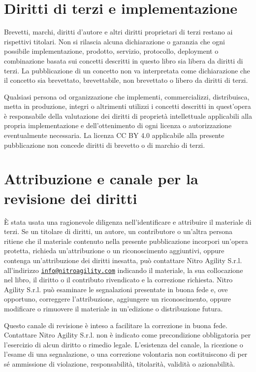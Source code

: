 \documentclass[10pt,oneside,openany]{book}
\begin{document}
\section{Diritti di terzi e implementazione}
Brevetti, marchi, diritti d'autore e altri diritti proprietari di terzi restano ai rispettivi titolari. Non si rilascia alcuna dichiarazione o garanzia che ogni possibile implementazione, prodotto, servizio, protocollo, deployment o combinazione basata sui concetti descritti in questo libro sia libera da diritti di terzi. La pubblicazione di un concetto non va interpretata come dichiarazione che il concetto sia brevettato, brevettabile, non brevettato o libero da diritti di terzi.

Qualsiasi persona od organizzazione che implementi, commercializzi, distribuisca, metta in produzione, integri o altrimenti utilizzi i concetti descritti in quest'opera è responsabile della valutazione dei diritti di proprietà intellettuale applicabili alla propria implementazione e dell'ottenimento di ogni licenza o autorizzazione eventualmente necessaria. La licenza CC BY 4.0 applicabile alla presente pubblicazione non concede diritti di brevetto o di marchio di terzi.

\section{Attribuzione e canale per la revisione dei diritti}
È stata usata una ragionevole diligenza nell'identificare e attribuire il materiale di terzi. Se un titolare di diritti, un autore, un contributore o un'altra persona ritiene che il materiale contenuto nella presente pubblicazione incorpori un'opera protetta, richieda un'attribuzione o un riconoscimento aggiuntivi, oppure contenga un'attribuzione dei diritti inesatta, può contattare Nitro Agility S.r.l. all'indirizzo \href{mailto:info@nitroagility.com}{\nolinkurl{info@nitroagility.com}} indicando il materiale, la sua collocazione nel libro, il diritto o il contributo rivendicato e la correzione richiesta. Nitro Agility S.r.l. può esaminare le segnalazioni presentate in buona fede e, ove opportuno, correggere l'attribuzione, aggiungere un riconoscimento, oppure modificare o rimuovere il materiale in un'edizione o distribuzione futura.

Questo canale di revisione è inteso a facilitare la correzione in buona fede. Contattare Nitro Agility S.r.l. non è indicato come precondizione obbligatoria per l'esercizio di alcun diritto o rimedio legale. L'esistenza del canale, la ricezione o l'esame di una segnalazione, o una correzione volontaria non costituiscono di per sé ammissione di violazione, responsabilità, titolarità, validità o azionabilità.
\end{document}
